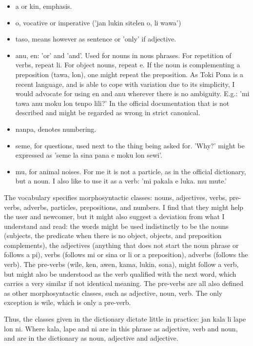 \documentclass{article}
\begin{document}
\begin{itemize}
  \item a or kin, emphasis.
  \item o, vocative or imperative ('jan lukin sitelen o, li wawa')
  \item taso, means however as sentence or 'only' if adjective.
  \item anu, en: 'or' and 'and'. Used for nouns in nous phrases.
    For repetition of verbs, repeat li.
    For object nouns, repeat e.
    If the noun is complementing a preposition (tawa, lon),
    one might repeat the preposition.
    As Toki Pona is a recent language, and is able to cope with
    variation due to its simplicity, I would advocate for
    using en and anu wherever there is no ambiguity.
    E.g.: 'mi tawa anu moku lon tenpo lili?'
    In the official documentation that is not described and
    might be regarded as wrong in strict canonical.
  \item nanpa, denotes numbering.
  \item seme, for questions, used next to the thing being asked for.
    'Why?' might be expressed as
    'seme la sina pana e moku lon sewi'.
  \item mu, for animal noises. For me it is not a particle, as in the
    official dictionary, but a noun.
    I also like to use it as a verb:
    'mi pakala e luka. mu mute.'
\end{itemize}

The vocabulary specifies morphosyntactic classes:
nouns, adjectives, verbs, pre-verbs, adverbs, particles, prepositions, and numbers.
I find that they might help the user and newcomer, but
it might also suggest a deviation from what I understand and read:
the words might be used indistinctly to be the nouns
(subjects, the predicate when there is no object, objects,
and preposition complements),
the adjectives (anything that does not start the noun phrase or follows a pi),
verbs
(follows mi or sina or li or a preposition),
adverbs (follows the verb).
The pre-verbs (wile, ken, awen, kama, lukin, sona),
might follow a verb, but might also be understood
as the verb qualified with the next word,
which carries a very similar if not identical meaning.
The pre-verbs are all also defined as other morphosyntactic classes,
such as adjective, noun, verb.
The only exception is wile, which is only a pre-verb.

Thus, the classes given in the dictionary dictate little
in practice:
jan kala li lape lon ni.
Where kala, lape and ni are in this phrase
as adjective, verb and noun,
and are in the dictionary as noun,
adjective and adjective.
\end{document}
